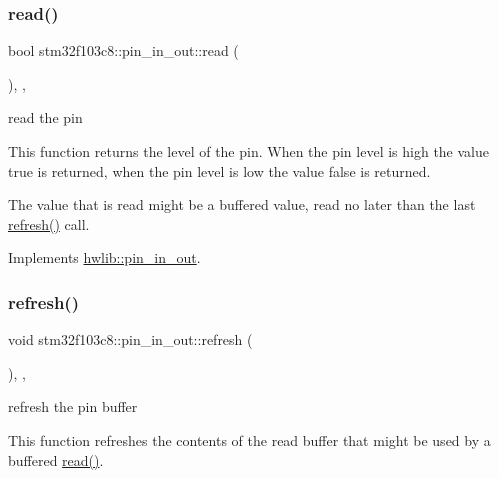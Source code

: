 \mbox{\label{classstm32f103c8_1_1pin__in__out_a9ca1d7aba45a4f28c9a69114dd6caf5b}} 
\subsubsection{\texorpdfstring{read()}{read()}}
{\footnotesize\ttfamily bool stm32f103c8\+::pin\+\_\+in\+\_\+out\+::read (\begin{DoxyParamCaption}{ }\end{DoxyParamCaption})\hspace{0.3cm}{\ttfamily [inline]}, {\ttfamily [override]}, {\ttfamily [virtual]}}

read the pin

This function returns the level of the pin. When the pin level is high the value true is returned, when the pin level is low the value false is returned.

The value that is read might be a buffered value, read no later than the last \hyperlink{classstm32f103c8_1_1pin__in__out_a58499208b2e6049e7ae88862b029099f}{refresh()} call. 

Implements \hyperlink{classhwlib_1_1pin__in__out_a5caebc7ab9fe49b7e020b89f0a2cf892}{hwlib\+::pin\+\_\+in\+\_\+out}.

\mbox{\label{classstm32f103c8_1_1pin__in__out_a58499208b2e6049e7ae88862b029099f}} 
\subsubsection{\texorpdfstring{refresh()}{refresh()}}
{\footnotesize\ttfamily void stm32f103c8\+::pin\+\_\+in\+\_\+out\+::refresh (\begin{DoxyParamCaption}{ }\end{DoxyParamCaption})\hspace{0.3cm}{\ttfamily [inline]}, {\ttfamily [override]}, {\ttfamily [virtual]}}

refresh the pin buffer

This function refreshes the contents of the read buffer that might be used by a buffered \hyperlink{classstm32f103c8_1_1pin__in__out_a9ca1d7aba45a4f28c9a69114dd6caf5b}{read()}.

